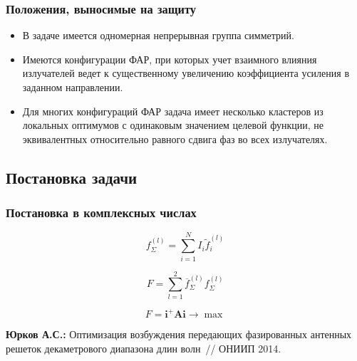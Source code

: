 \begin{frame}
    \frametitle{Положения, выносимые на защиту}
    \begin{itemize}
        \item В задаче имеется одномерная непрерывная группа симметрий.
        \item Имеются конфигурации ФАР, при которых учет взаимного влияния излучателей ведет к существенному увеличению коэффициента усиления в заданном направлении.
        \item Для многих конфигураций ФАР задача имеет несколько кластеров из локальных оптимумов с одинаковым значением целевой функции, не эквивалентных относительно равного сдвига фаз во всех излучателях.
    \end{itemize}
\end{frame}

\subsection{Постановка задачи}
\begin{frame}
    \frametitle{Постановка в комплексных числах}
    \begin{equation}
    f^{(l)}_{\Sigma} = \sum_{i=1}^{N}I_i \tilde{f}_i^{(l)}
    \label{eq:sumfield}
    \end{equation}

     \begin{equation}
        F = \sum_{l=1}^{2}\overline{f}_{\Sigma}^{(l)}f_{\Sigma}^{(l)}
        \label{eq:FPrimary}
    \end{equation}
    
        \begin{equation}
        F = \textbf{i}^{+}\textbf{Ai} \rightarrow \max
        \label{eq:F}
    \end{equation}

\vspace{2em}
    \textbf{Юрков А.С.:} Оптимизация возбуждения передающих фазированных антенных решеток декаметрового диапазона длин волн~// ОНИИП 2014. 
\end{frame}

